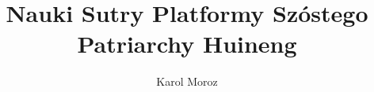 \documentclass[12pt]{wzmgr}
\author{Karol Moroz}
\title{Nauki Sutry Platformy Szóstego Patriarchy Huineng}
\begin{document}
\onehalfspacing
\maketitle




%
\end{document}
